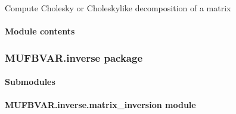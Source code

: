 \documentclass[letterpaper,10pt,english]{sphinxmanual}
\begin{document}
\begin{fulllineitems}
\label{\detokenize{MUFBVAR.cholcov:MUFBVAR.cholcov.cholcov_module.cholcovOrEigendecomp}}
\pysigstartsignatures
{}
\pysigstopsignatures
\sphinxAtStartPar
Compute Cholesky or Cholesky\sphinxhyphen{}like decomposition of a matrix

\end{fulllineitems}



\paragraph{Module contents}
\label{\detokenize{MUFBVAR.cholcov:module-MUFBVAR.cholcov}}\label{\detokenize{MUFBVAR.cholcov:module-contents}}
\sphinxstepscope


\subsubsection{MUFBVAR.inverse package}
\label{\detokenize{MUFBVAR.inverse:mufbvar-inverse-package}}\label{\detokenize{MUFBVAR.inverse::doc}}

\paragraph{Submodules}
\label{\detokenize{MUFBVAR.inverse:submodules}}

\paragraph{MUFBVAR.inverse.matrix\_inversion module}
\label{\detokenize{MUFBVAR.inverse:module-MUFBVAR.inverse.matrix_inversion}}\label{\detokenize{MUFBVAR.inverse:mufbvar-inverse-matrix-inversion-module}}
\end{document}
